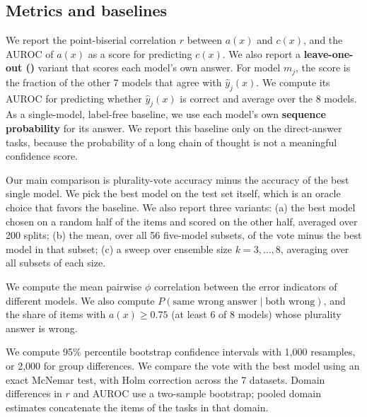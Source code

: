 \subsection{Metrics and baselines}
\label{sec:metrics}

We report the point-biserial correlation $r$ between $a(x)$ and $c(x)$, and the AUROC of $a(x)$ as a score for predicting $c(x)$.
We also report a {\bf leave-one-out (\loo)} variant that scores each model's own answer.
For model $m_j$, the score is the fraction of the other 7 models that agree with $\hat y_j(x)$.
We compute its AUROC for predicting whether $\hat y_j(x)$ is correct and average over the 8 models.
As a single-model, label-free baseline, we use each model's own {\bf sequence probability} for its answer.
We report this baseline only on the direct-answer tasks, because the probability of a long chain of thought is not a meaningful confidence score.

Our main comparison is plurality-vote accuracy minus the accuracy of the best single model.
We pick the best model on the test set itself, which is an oracle choice that favors the baseline.
We also report three variants:
(a) the best model chosen on a random half of the items and scored on the other half, averaged over 200 splits;
(b) the mean, over all 56 five-model subsets, of the vote minus the best model in that subset;
(c) a sweep over ensemble size $k=3,\dots,8$, averaging over all subsets of each size.

We compute the mean pairwise $\phi$ correlation between the error indicators of different models.
We also compute $P(\text{same wrong answer} \mid \text{both wrong})$, and the share of items with $a(x) \geq 0.75$ (at least 6 of 8 models) whose plurality answer is wrong.

We compute 95\% percentile bootstrap confidence intervals with 1,000 resamples, or 2,000 for group differences.
We compare the vote with the best model using an exact McNemar test, with Holm correction across the 7 datasets.
Domain differences in $r$ and AUROC use a two-sample bootstrap; pooled domain estimates concatenate the items of the tasks in that domain.
